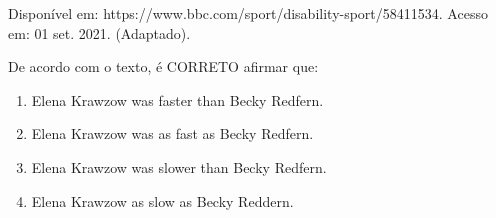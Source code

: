 Disponível em: https://www.bbc.com/sport/disability-sport/58411534. Acesso em: 01 set. 2021. (Adaptado).

De acordo com o texto, é CORRETO afirmar que:\begin{enumerate}
\item Elena Krawzow was faster than Becky Redfern.
\item Elena Krawzow was as fast as Becky Redfern.
\item Elena Krawzow was slower than Becky Redfern.
\item Elena Krawzow as slow as Becky Reddern.
\end{enumerate}
